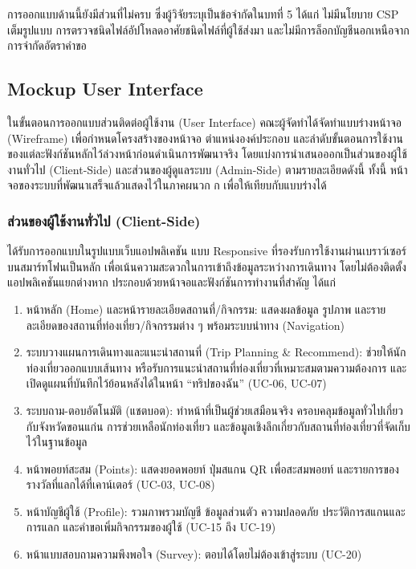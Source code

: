 การออกแบบด้านนี้ยังมีส่วนที่ไม่ครบ ซึ่งผู้วิจัยระบุเป็นข้อจำกัดในบทที่ 5 ได้แก่ ไม่มีนโยบาย CSP เต็มรูปแบบ การตรวจชนิดไฟล์อัปโหลดอาศัยชนิดไฟล์ที่ผู้ใช้ส่งมา และไม่มีการล็อกบัญชีนอกเหนือจากการจำกัดอัตราคำขอ

\subsection{Mockup User Interface}

ในขั้นตอนการออกแบบส่วนติดต่อผู้ใช้งาน (User Interface) คณะผู้จัดทำได้จัดทำแบบร่างหน้าจอ (Wireframe) เพื่อกำหนดโครงสร้างของหน้าจอ ตำแหน่งองค์ประกอบ และลำดับขั้นตอนการใช้งานของแต่ละฟังก์ชันหลักไว้ล่วงหน้าก่อนดำเนินการพัฒนาจริง โดยแบ่งการนำเสนอออกเป็นส่วนของผู้ใช้งานทั่วไป (Client-Side) และส่วนของผู้ดูแลระบบ (Admin-Side) ตามรายละเอียดดังนี้ ทั้งนี้ หน้าจอของระบบที่พัฒนาเสร็จแล้วแสดงไว้ในภาคผนวก ก เพื่อให้เทียบกับแบบร่างได้

\subsubsection{ส่วนของผู้ใช้งานทั่วไป (Client-Side)}

ได้รับการออกแบบในรูปแบบเว็บแอปพลิเคชัน แบบ Responsive ที่รองรับการใช้งานผ่านเบราว์เซอร์บนสมาร์ทโฟนเป็นหลัก เพื่อเน้นความสะดวกในการเข้าถึงข้อมูลระหว่างการเดินทาง โดยไม่ต้องติดตั้งแอปพลิเคชันแยกต่างหาก ประกอบด้วยหน้าจอและฟังก์ชันการทำงานที่สำคัญ ได้แก่

\begin{enumerate}
\item หน้าหลัก (Home) และหน้ารายละเอียดสถานที่/กิจกรรม: แสดงผลข้อมูล รูปภาพ และรายละเอียดของสถานที่ท่องเที่ยว/กิจกรรมต่าง ๆ พร้อมระบบนำทาง (Navigation)
\item ระบบวางแผนการเดินทางและแนะนำสถานที่ (Trip Planning \& Recommend): ช่วยให้นักท่องเที่ยวออกแบบเส้นทาง หรือรับการแนะนำสถานที่ท่องเที่ยวที่เหมาะสมตามความต้องการ และเปิดดูแผนที่บันทึกไว้ย้อนหลังได้ในหน้า ``ทริปของฉัน'' (UC-06, UC-07)
\item ระบบถาม-ตอบอัตโนมัติ (แชตบอต): ทำหน้าที่เป็นผู้ช่วยเสมือนจริง ครอบคลุมข้อมูลทั่วไปเกี่ยวกับจังหวัดขอนแก่น การช่วยเหลือนักท่องเที่ยว และข้อมูลเชิงลึกเกี่ยวกับสถานที่ท่องเที่ยวที่จัดเก็บไว้ในฐานข้อมูล
\item หน้าพอยท์สะสม (Points): แสดงยอดพอยท์ ปุ่มสแกน QR เพื่อสะสมพอยท์ และรายการของรางวัลที่แลกได้ที่เคาน์เตอร์ (UC-03, UC-08)
\item หน้าบัญชีผู้ใช้ (Profile): รวมภาพรวมบัญชี ข้อมูลส่วนตัว ความปลอดภัย ประวัติการสแกนและการแลก และคำขอเพิ่มกิจกรรมของผู้ใช้ (UC-15 ถึง UC-19)
\item หน้าแบบสอบถามความพึงพอใจ (Survey): ตอบได้โดยไม่ต้องเข้าสู่ระบบ (UC-20)
\end{enumerate}


